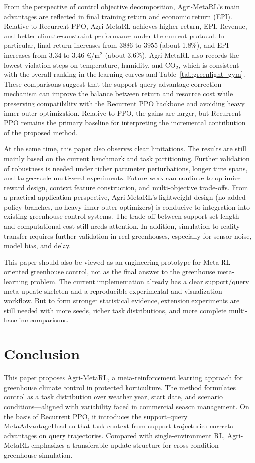 \documentclass[number,preprint,review,12pt]{elsarticle}
\begin{document}
From the perspective of control objective decomposition, Agri-MetaRL's main advantages are reflected in final training return and economic return (EPI). Relative to Recurrent PPO, Agri-MetaRL achieves higher return, EPI, Revenue, and better climate-constraint performance under the current protocol. In particular, final return increases from 3886 to 3955 (about 1.8\%), and EPI increases from 3.34 to 3.46 €/m$^2$ (about 3.6\%). Agri-MetaRL also records the lowest violation steps on temperature, humidity, and CO$_2$, which is consistent with the overall ranking in the learning curves and Table~\ref{tab:greenlight_gym}. These comparisons suggest that the support-query advantage correction mechanism can improve the balance between return and resource cost while preserving compatibility with the Recurrent PPO backbone and avoiding heavy inner-outer optimization. Relative to PPO, the gains are larger, but Recurrent PPO remains the primary baseline for interpreting the incremental contribution of the proposed method.

At the same time, this paper also observes clear limitations. The results are still mainly based on the current benchmark and task partitioning. Further validation of robustness is needed under richer parameter perturbations, longer time spans, and larger-scale multi-seed experiments. Future work can continue to optimize reward design, context feature construction, and multi-objective trade-offs. From a practical application perspective, Agri-MetaRL's lightweight design (no added policy branches, no heavy inner-outer optimizers) is conducive to integration into existing greenhouse control systems. The trade-off between support set length and computational cost still needs attention. In addition, simulation-to-reality transfer requires further validation in real greenhouses, especially for sensor noise, model bias, and delay.

This paper should also be viewed as an engineering prototype for Meta-RL-oriented greenhouse control, not as the final answer to the greenhouse meta-learning problem. The current implementation already has a clear support/query meta-update skeleton and a reproducible experimental and visualization workflow. But to form stronger statistical evidence, extension experiments are still needed with more seeds, richer task distributions, and more complete multi-baseline comparisons.

\section{Conclusion}
This paper proposes Agri-MetaRL, a meta-reinforcement learning approach for greenhouse climate control in protected horticulture. The method formulates control as a task distribution over weather year, start date, and scenario conditions---aligned with variability faced in commercial season management. On the basis of Recurrent PPO, it introduces the support--query MetaAdvantageHead so that task context from support trajectories corrects advantages on query trajectories. Compared with single-environment RL, Agri-MetaRL emphasizes a transferable update structure for cross-condition greenhouse simulation.
\end{document}
